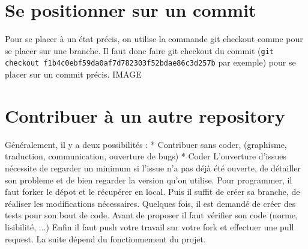 \documentclass[a4paper,10pt]{report}
\begin{document}
  \section{Se positionner sur un commit}
  Pour se placer à un état précis, on utilise la commande git checkout comme pour se placer sur une branche. Il faut donc faire git checkout \no du commit (\verb|git checkout f1b4c0ebf59da0af7d782303f52bdae86c3d257b| par exemple) pour se placer sur un commit précis.
  IMAGE
  \section{Contribuer à un autre repository}
Généralement, il y a deux possibilités : 
* Contribuer sans coder, (graphisme, traduction, communication, ouverture de bugs)
* Coder
L'ouverture d'issues nécessite de regarder un minimum si l'issue n'a pas déjà été ouverte, de détailler son probleme et de bien regarder la version qu'on utilise.
Pour programmer, il faut forker le dépot et le récupérer en local.
Puis il suffit de créer sa branche, de réaliser les modifications nécessaires.
Quelques fois, il est demandé de créer des tests pour son bout de code.
Avant de proposer il faut vérifier son code (norme, lisibilité, ...)
Enfin il faut push votre travail sur votre fork et effectuer une pull request.
La suite dépend du fonctionnement du projet.
\end{document}
